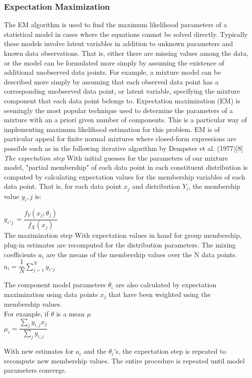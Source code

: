 \documentclass[a4paper]{article}
\begin{document}
\subsubsection{Expectation Maximization}
The EM algorithm is used to find the maximum likelihood parameters of a statistical model in cases where the equations cannot be solved directly. Typically these models involve latent variables in addition to unknown parameters and known data observations. That is, either there are missing values among the data, or the model can be formulated more simply by assuming the existence of additional unobserved data points. For example, a mixture model can be described more simply by assuming that each observed data point has a corresponding unobserved data point, or latent variable, specifying the mixture component that each data point belongs to.
Expectation maximization (EM) is seemingly the most popular technique used to determine the parameters of a mixture with an a priori given number of components. This is a particular way of implementing maximum likelihood estimation for this problem. EM is of particular appeal for finite normal mixtures where closed-form expressions are possible such as in the following iterative algorithm by Dempster et al. (1977)[8]
\emph{The expectation step}
With initial guesses for the parameters of our mixture model, "partial membership" of each data point in each constituent distribution is computed by calculating expectation values for the membership variables of each data point. That is, for each data point $x_j$ and distribution $Y_i$, the membership value $y_i, j$ is:

$y_i,_j=\dfrac{f_Y(x_j;\theta_j)}{f_X(x_j)}$\\
The maximization step
With expectation values in hand for group membership, plug-in estimates are recomputed for the distribution parameters.
The mixing coefficients $a_i$ are the means of the membership values over the N data points.\\

$a_i=\dfrac{1}{N} \sum\limits_{j=1}^{N} y_i,_j$

The component model parameters $\theta_i$ are also calculated by expectation maximization using data points $x_j$ that have been weighted using the membership values. \\
For example, if $\theta$ is a mean $\mu$\\
  $ \mu_i=\dfrac{\sum\limits_{j}y_{i,j} x_j}{\sum\limits_j{y_{i,j}}}$

With new estimates for $a_i$ and the $\theta_i$'s, the expectation step is repeated to recompute new membership values. The entire procedure is repeated until model parameters converge.
\\
\end{document}
